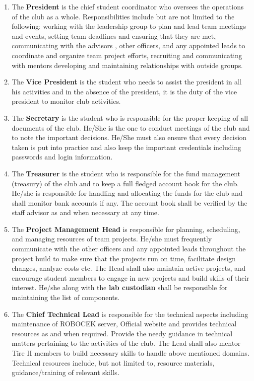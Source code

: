 \begin{enumerate}
	\item The \textbf{President} is the chief student coordinator who oversees the operations of the club as a whole. Responsibilities include but are not limited to the following: working with the leadership group to plan and lead team meetings and events, setting team deadlines and ensuring that they are met, communicating with the advisors , other officers, and any appointed leads to coordinate and organize team project efforts, recruiting and communicating with mentors developing and maintaining relationships with outside groups. 
	
	\item The \textbf{Vice President} is the student who needs to assist the president in all his activities and in the absence of the president, it is the duty of the vice president to monitor club activities.
	
	\item The \textbf{Secretary} is the student who is responsible for the proper keeping of all documents of the club. He/She is the one to conduct meetings of the club and to note the important decisions. He/She must also ensure that every decision taken is put into practice and also keep the important credentials including passwords and login information.
	
	\item The \textbf{Treasurer} is the student who is responsible for the fund management (treasury) of the club and to keep a full fledged account book for the club. He/she is responsible for handling and allocating the funds for the club and shall monitor bank accounts if any. The account book shall be verified by the staff advisor as and when necessary at any time.
	
	\item The \textbf{Project Management Head} is responsible for planning, scheduling, and managing resources of team projects. He/she must frequently communicate with the other officers and any appointed leads throughout the project build to make sure that the projects run on time, facilitate design changes, analyze costs etc. The Head shall also maintain active projects, and encourage student members to engage in new projects and build skills of their interest. He/she along with the \textbf{lab custodian} shall be responsible for maintaining the list of components.
	
	\item The \textbf{Chief Technical Lead} is responsible for the technical aspects including maintenance of ROBOCEK server, Official website and provides technical resources as and when required. Provide the needy guidance in
	technical matters pertaining to the activities of the club. The Lead shall also mentor Tire II members to build necessary skills to handle above mentioned domains. Technical resources include, but not limited to, resource materials, guidance/training of relevant skills.
	

\end{enumerate}
